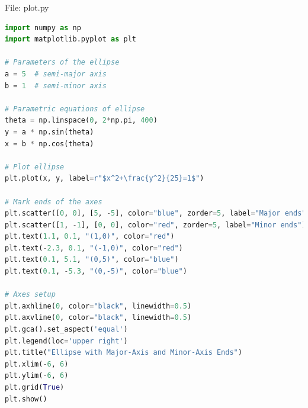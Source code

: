 \documentclass{beamer}
\numberwithin{equation}{section}
\theoremstyle{remark}
\begin{document}
\begin{frame}[fragile]{File: plot.py}
\begin{lstlisting}[language=Python]
import numpy as np
import matplotlib.pyplot as plt

# Parameters of the ellipse
a = 5  # semi-major axis
b = 1  # semi-minor axis

# Parametric equations of ellipse
theta = np.linspace(0, 2*np.pi, 400)
y = a * np.sin(theta)
x = b * np.cos(theta)

# Plot ellipse
plt.plot(x, y, label=r"$x^2+\frac{y^2}{25}=1$")

# Mark ends of the axes
plt.scatter([0, 0], [5, -5], color="blue", zorder=5, label="Major ends")
plt.scatter([1, -1], [0, 0], color="red", zorder=5, label="Minor ends")
plt.text(1.1, 0.1, "(1,0)", color="red")
plt.text(-2.3, 0.1, "(-1,0)", color="red")
plt.text(0.1, 5.1, "(0,5)", color="blue")
plt.text(0.1, -5.3, "(0,-5)", color="blue")

# Axes setup
plt.axhline(0, color="black", linewidth=0.5)
plt.axvline(0, color="black", linewidth=0.5)
plt.gca().set_aspect('equal')
plt.legend(loc='upper right')
plt.title("Ellipse with Major-Axis and Minor-Axis Ends")
plt.xlim(-6, 6)
plt.ylim(-6, 6)
plt.grid(True)
plt.show()
\end{lstlisting}
\end{frame}
\end{document}
